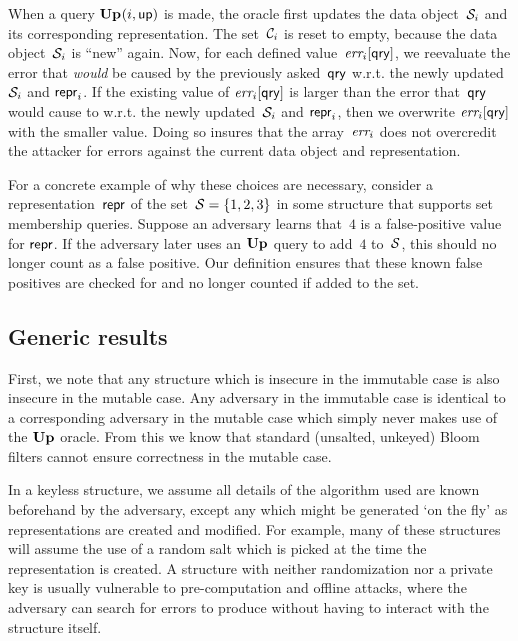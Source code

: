 When a query $\mathbf{Up}\hspace{0.5pt}(i,\mathsf{up})$ is made, the oracle first updates the data object~$\mathcal{S}_i$ and its corresponding representation.  The set~$\mathcal{C}_i$ is reset to empty, because the data object~$\mathcal{S}_i$ is ``new'' again.
%
Now, for each defined value~$\textit{err}_i[\mathsf{qry}]$, we reevaluate the error that \emph{would} be caused by the previously asked~$\mathsf{qry}$ w.r.t. the newly updated $\mathcal{S}_i$ and $\mathsf{repr}_i$.  If the existing value of $\textit{err}_i[\mathsf{qry}]$ is larger than the error that~$\mathsf{qry}$ would cause to w.r.t. the newly updated~$\mathcal{S}_i$ and $\mathsf{repr}_i$, then we overwrite $\textit{err}_i[\mathsf{qry}]$ with the smaller value.  Doing so insures that the array~$\textit{err}_i$ does not overcredit the attacker for errors against the current data object and representation.

For a concrete example of why these choices are necessary, consider a representation~$\mathsf{repr}$ of the set~$\mathcal{S} = \{1,2,3\}$ in some structure that supports set membership queries. Suppose an adversary learns that~$4$ is a false-positive value for $\mathsf{repr}$. If the adversary later uses an $\mathbf{Up}\hspace{0.5pt}$ query to add~$4$ to~$\mathcal{S}$, this should no longer count as a false positive. Our definition ensures that these known false positives are checked for and no longer counted if added to the set.

\subsection{Generic results}
First, we note that any structure which is insecure in the immutable case is also insecure in the mutable case. Any adversary in the immutable case is identical to a corresponding adversary in the mutable case which simply never makes use of the $\mathbf{Up}\hspace{0.5pt}$ oracle. From this we know that standard (unsalted, unkeyed) Bloom filters cannot ensure correctness in the mutable case. 



In a keyless structure, we assume all details of the algorithm used are known beforehand by the adversary, except any which might be generated `on the fly' as representations are created and modified. For example, many of these structures will assume the use of a random salt which is picked at the time the representation is created. A structure with neither randomization nor a private key is usually vulnerable to pre-computation and offline attacks, where the adversary can search for errors to produce without having to interact with the structure itself.

